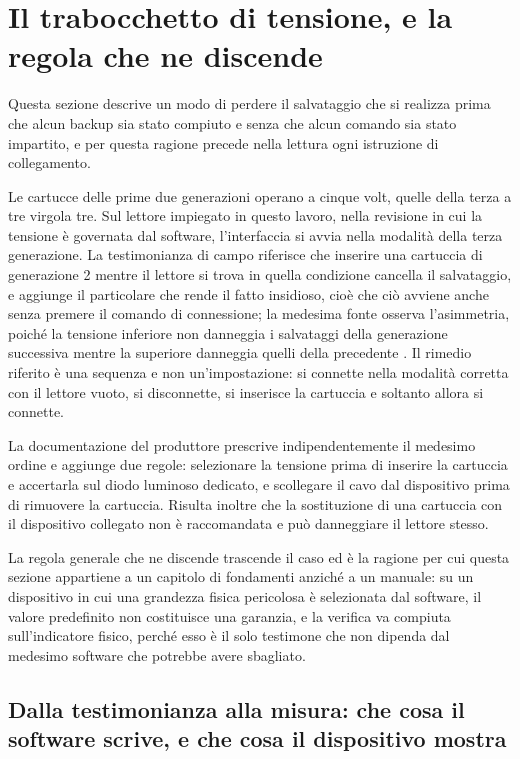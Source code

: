 \section{Il trabocchetto di tensione, e la regola che ne discende}

Questa sezione descrive un modo di perdere il salvataggio che si realizza prima che alcun backup sia stato compiuto e senza che alcun comando sia stato impartito, e per questa ragione precede nella lettura ogni istruzione di collegamento.

Le cartucce delle prime due generazioni operano a cinque volt, quelle della terza a tre virgola tre. Sul lettore impiegato in questo lavoro, nella revisione in cui la tensione è governata dal software, l'interfaccia si avvia nella modalità della terza generazione. La testimonianza di campo riferisce che inserire una cartuccia di generazione 2 mentre il lettore si trova in quella condizione cancella il salvataggio, e aggiunge il particolare che rende il fatto insidioso, cioè che ciò avviene anche senza premere il comando di connessione; la medesima fonte osserva l'asimmetria, poiché la tensione inferiore non danneggia i salvataggi della generazione successiva mentre la superiore danneggia quelli della precedente \cite{insidegadgets-canale}. Il rimedio riferito è una sequenza e non un'impostazione: si connette nella modalità corretta con il lettore vuoto, si disconnette, si inserisce la cartuccia e soltanto allora si connette.

La documentazione del produttore prescrive indipendentemente il medesimo ordine e aggiunge due regole: selezionare la tensione prima di inserire la cartuccia e accertarla sul diodo luminoso dedicato, e scollegare il cavo dal dispositivo prima di rimuovere la cartuccia. Risulta inoltre che la sostituzione di una cartuccia con il dispositivo collegato non è raccomandata e può danneggiare il lettore stesso.

La regola generale che ne discende trascende il caso ed è la ragione per cui questa sezione appartiene a un capitolo di fondamenti anziché a un manuale: su un dispositivo in cui una grandezza fisica pericolosa è selezionata dal software, il valore predefinito non costituisce una garanzia, e la verifica va compiuta sull'indicatore fisico, perché esso è il solo testimone che non dipenda dal medesimo software che potrebbe avere sbagliato.

\subsection{Dalla testimonianza alla misura: che cosa il software scrive, e che cosa il dispositivo mostra}

